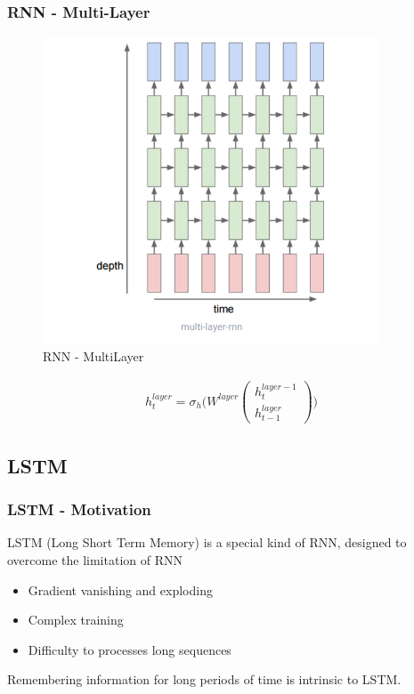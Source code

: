 \documentclass[12pt]{report}
\begin{document}
\subsubsection{RNN - Multi-Layer}
\begin{figure}[H]\centering\includegraphics[width=10cm]{RNN_MULTI.png}\caption{RNN - MultiLayer}\end{figure}
\begin{align*}
	h_t^{layer} = \sigma_h \bigg(W^{layer} \begin{pmatrix}
		h_{t}^{layer-1} \\ h_{t-1}^{layer}
	\end{pmatrix} \bigg)
\end{align*}


\newpage
\subsection{LSTM}


\subsubsection{LSTM - Motivation}

LSTM (Long Short Term Memory) is a special kind of RNN,  designed to overcome the limitation of RNN
\begin{itemize}
	\item Gradient vanishing and exploding
	\item Complex training
	\item Difficulty to processes long sequences 
\end{itemize}

Remembering information for long periods of time is intrinsic to LSTM.
\end{document}
